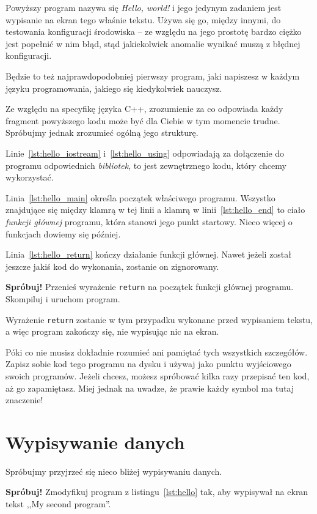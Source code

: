 \documentclass[11pt]{book}
\newenvironment{try}
{ \vspace{1em} \noindent
  \definecolor{shadecolor}{RGB}{239,255,158}
  \begin{minipage}{\textwidth} 
  \begin{shaded} 
  \textbf{Spróbuj!} }
{ \end{shaded} 
  \end{minipage} 
  \vspace{1em} }
\begin{document}
Powyższy program nazywa się \textit{Hello, world!} i jego jedynym zadaniem
jest wypisanie na ekran tego właśnie tekstu. Używa się go, między innymi,
do testowania konfiguracji środowiska -- ze względu na jego prostotę bardzo
ciężko jest popełnić w nim błąd, stąd jakiekolwiek anomalie wynikać muszą
z błędnej konfiguracji.

Będzie to też najprawdopodobniej pierwszy program, jaki napiszesz w każdym 
języku programowania, jakiego się kiedykolwiek nauczysz. 

Ze względu na specyfikę języka C++, zrozumienie za co odpowiada każdy fragment 
powyższego kodu może być dla Ciebie w tym momencie trudne. Spróbujmy jednak
zrozumieć ogólną jego strukturę.

Linie~\ref{lst:hello_iostream} i~\ref{lst:hello_using} odpowiadają za dołączenie
do programu odpowiednich \textit{bibliotek}, to jest zewnętrznego kodu, który
chcemy wykorzystać.

Linia~\ref{lst:hello_main} określa początek właściwego programu. Wszystko
znajdujące się między klamrą w tej linii a klamrą w linii~\ref{lst:hello_end}
to ciało \textit{funkcji głównej} programu, która stanowi jego punkt startowy.
Nieco więcej o funkcjach dowiemy się później.

Linia~\ref{lst:hello_return} kończy działanie funkcji głównej. Nawet jeżeli
został jeszcze jakiś kod do wykonania, zostanie on zignorowany.

\begin{try}
Przenieś wyrażenie \texttt{return} na początek funkcji głównej programu.
Skompiluj i uruchom program.
\end{try}

Wyrażenie \texttt{return} zostanie w tym przypadku wykonane przed wypisaniem
tekstu, a więc program zakończy się, nie wypisując nic na ekran.

Póki co nie musisz dokładnie rozumieć ani pamiętać tych wszystkich szczegółów.
Zapisz sobie kod tego programu na dysku i używaj jako punktu wyjściowego
swoich programów. Jeżeli chcesz, możesz spróbować kilka razy przepisać ten 
kod, aż go zapamiętasz. Miej jednak na uwadze, że prawie każdy symbol ma tutaj
znaczenie!

\section{Wypisywanie danych}
Spróbujmy przyjrzeć się nieco bliżej wypisywaniu danych.

\begin{try}
Zmodyfikuj program z listingu~\ref{lst:hello} tak, aby wypisywał na ekran tekst 
,,My second program''.
\end{try}
\end{document}
